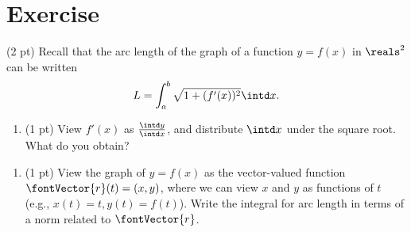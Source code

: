 \section{Exercise}

(2 pt) Recall that the arc length of the graph of a function $y = f(x)$ in $\reals^{2}$ can be written
\begin{align*}
L
=
\int_{a}^{b} \sqrt{1 + (f'(x))^{2}} \intd x.
\end{align*}
\begin{enumerate}[label=(\alph*)]
\item\label{itm: Quiz07a} (1 pt) View $f'(x)$ as $\frac{\intd y}{\intd x}$, and distribute $\intd x$ under the square root. What do you obtain?
\end{enumerate}

\spaceSolution{.5in}{}

\begin{enumerate}[resume,label=(\alph*)]
\item (1 pt) View the graph of $y = f(x)$ as the vector-valued function $\fontVector{r}(t) = (x,y)$, where we can view $x$ and $y$ as functions of $t$ (e.g., $x(t) = t,y(t) = f(t)$). Write the integral for arc length in terms of a norm related to $\fontVector{r}$. 
\end{enumerate}

\spaceSolution{.5in}{}
